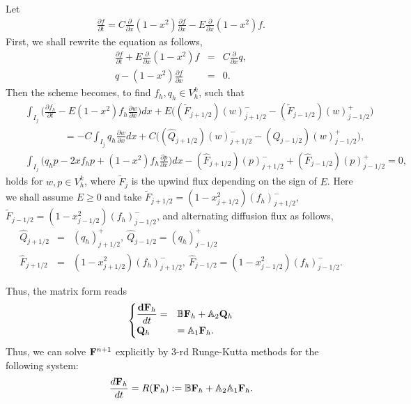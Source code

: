 \documentclass[final,leqno]{siamltex704}
\begin{document}
Let
\begin{eqnarray*}
\frac{\partial f}{\partial t} =   C\frac{\partial}{\partial x}(1-x^2)\frac{\partial f}{\partial x}-E\frac{\partial}{\partial x}(1-x^2)f .
\end{eqnarray*}
First, we shall rewrite the equation as follows,
\begin{eqnarray*}
\frac{\partial f}{\partial t}+E\frac{\partial }{\partial x} (1-x^2)f &=& C\frac{\partial }{\partial x}q,\\
q - (1-x^2)\frac{\partial f}{\partial x}&=&0.
\end{eqnarray*}
Then the scheme becomes, to find $f_h,q_h\in V_h^k$, such that
\begin{eqnarray*}
&&\int_{I_j}\bigg(\frac{\partial f_h}{\partial t} - E (1-x^2) f_h \frac{\partial w}{\partial x}\bigg) dx +E\bigg( (\tilde{F}_{j+1/2})(w)^-_{j+1/2}-(\tilde{F}_{j-1/2})(w)^+_{j-1/2}\bigg)
\\
&&\quad\quad\quad\quad=-C\int_{I_j}q_h\frac{\partial w}{\partial x}dx + C\bigg( (\hat{Q}_{j+1/2})(w)^-_{j+1/2} -(\hat{Q}_{j-1/2})(w)^+_{j-1/2}\bigg),
\\
&&\int_{I_j}\bigg(q_h p-2xf_h p+(1-x^2)f_h\frac{\partial p}{\partial x}\bigg)dx-(\hat{F}_{j+1/2})(p)^-_{j+1/2}+(\hat{F}_{j-1/2})(p)^+_{j-1/2}=0,
\end{eqnarray*}
holds for $w,p\in V_h^k$, where $\tilde{F}_j$ is the upwind flux depending on the sign of $E$.
Here we shall assume $E\ge 0$ and take $\tilde{F}_{j+1/2}=(1-x_{j+1/2}^2)(f_h)_{j+1/2}^-$, $\tilde{F}_{j-1/2}=(1-x_{j-1/2}^2)(f_h)_{j-1/2}^-$, and alternating diffusion flux as follows,
\begin{eqnarray*}
\hat{Q}_{j+1/2}&=&(q_h)_{j+1/2}^+,\
 \hat{Q}_{j-1/2}=(q_h)_{j-1/2}^+
 \\
\hat{F}_{j+1/2}&=&{(1-x_{j+1/2}^2)}(f_h)_{j+1/2}^-,\
 \hat{F}_{j-1/2}={(1-x_{j-1/2}^2)}(f_h)_{j-1/2}^-.
\end{eqnarray*}

Thus, the matrix form reads
\begin{eqnarray*}
\begin{cases}
\dfrac{{\bf dF}_h}{dt} =& \mathbb{B}{\bf F}_h+\mathbb{A}_{2}{\bf Q}_h \\
{\bf Q}_h &= \mathbb{A}_{1} {\bf F}_h.
\end{cases}
\end{eqnarray*}
Thus, we can solve ${\bf F}^{n+1}$ explicitly by 3-rd Runge-Kutta methods for the following system:
\begin{eqnarray}
\frac{d{\bf F}_h}{dt} = R({\bf F}_h):= \mathbb{B}{\bf F}_h+\mathbb{A}_{2}\mathbb{A}_{1}{\bf F}_h.
\end{eqnarray}
\end{document}
